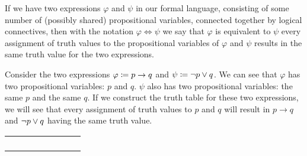 \begin{definition}[Equivalence]
    If we have two expressions \(\varphi\) and \(\psi\) in our formal language,
    consisting of some number of (possibly shared) propositional variables, connected together by logical connectives,
    then with the notation \(\varphi \iff \psi\) we say that \(\varphi\) is equivalent to \(\psi\)
    \iffbydefn every assignment of truth values to the propositional variables of \(\varphi\) and \(\psi\) results
    in the same truth value for the two expressions.
\end{definition}
\begin{example}
    Consider the two expressions \(\varphi \coloneqq p \rightarrow q\) and \(\psi \coloneqq \neg p \vee q\).
    We can see that \(\varphi\) has two propositional variables: \(p\) and \(q\).
    \(\psi\) also has two propositional variables: the same \(p\) and the same \(q\).
    If we construct the truth table for these two expressions,
    we will see that every assignment of truth values to \(p\) and \(q\) will result in \(p \rightarrow q\) and \(\neg p \vee q\)
    having the same truth value.

    \begin{table}[H]
        \centering
        \begin{tabular}{|CcCc||CcCc|}
            \hline
             &  &  & \\ \hline
            \thead{\(\top\)} & \thead{\(\top\)} &  & \\
            \thead{\(\top\)} & \thead{\(\bot\)} &  & \\
            \thead{\(\bot\)} & \thead{\(\top\)} &  &  \\
            \thead{\(\bot\)} & \thead{\(\bot\)} &  &  \\ \hline
        \end{tabular}
    \end{table}
\end{example}

